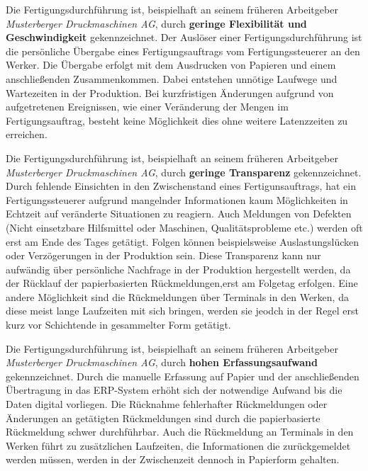 \begin{definitionForm}[KA-B-1]
Die Fertigungsdurchführung ist, beispielhaft an seinem früheren Arbeitgeber \textit{Musterberger Druckmaschinen AG}, durch \textbf{geringe Flexibilität und Geschwindigkeit} gekennzeichnet. Der Auslöser einer Fertigungsdurchführung ist die persönliche Übergabe eines Fertigungsauftrags vom Fertigungssteuerer an den Werker. Die Übergabe erfolgt mit dem Ausdrucken von Papieren und einem anschließenden Zusammenkommen. Dabei entstehen unnötige Laufwege und Wartezeiten in der Produktion. Bei kurzfristigen Änderungen aufgrund von aufgetretenen Ereignissen, wie einer Veränderung der Mengen im Fertigungsauftrag, besteht keine Möglichkeit dies ohne weitere Latenzzeiten zu erreichen.
\end{definitionForm}

\begin{definitionForm}[KA-B-2]
Die Fertigungsdurchführung ist, beispielhaft an seinem früheren Arbeitgeber \textit{Musterberger Druckmaschinen AG}, durch \textbf{geringe Transparenz} gekennzeichnet. Durch fehlende Einsichten in den Zwischenstand eines Fertigunsauftrags, hat ein Fertigungssteuerer aufgrund mangelnder Informationen kaum Möglichkeiten in Echtzeit auf veränderte Situationen zu reagiern. Auch Meldungen von Defekten (Nicht einsetzbare Hilfsmittel oder Maschinen, Qualitätsprobleme etc.) werden oft erst am Ende des Tages getätigt. Folgen können beispielsweise Auslastungslücken oder Verzögerungen in der Produktion sein. Diese Transparenz kann nur aufwändig über persönliche Nachfrage in der Produktion hergestellt werden, da der Rücklauf der papierbasierten Rückmeldungen,erst am Folgetag erfolgen. Eine andere Möglichkeit sind die Rückmeldungen über Terminals in den Werken, da diese meist lange Laufzeiten mit sich bringen, werden sie jeodch in der Regel erst kurz vor Schichtende in gesammelter Form getätigt. 
\end{definitionForm}

\begin{definitionForm}[KA-B-3]
Die Fertigungsdurchführung ist, beispielhaft an seinem früheren Arbeitgeber \textit{Musterberger Druckmaschinen AG}, durch \textbf{hohen Erfassungsaufwand} gekennzeichnet. Durch die manuelle Erfassung auf Papier und der anschließenden Übertragung in das ERP-System erhöht sich der notwendige Aufwand bis die Daten digital vorliegen. Die Rücknahme fehlerhafter Rückmeldungen oder Änderungen an getätigten Rückmeldungen sind durch die papierbasierte Rückmeldung schwer durchführbar. Auch die Rückmeldung an Terminals in den Werken führt zu zusätzlichen Laufzeiten, die Informationen die zurückgemeldet werden müssen, werden in der Zwischenzeit dennoch in Papierform gehalten. 
\end{definitionForm}

